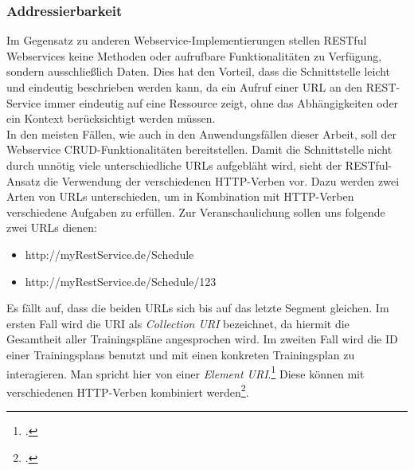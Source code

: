 \subsubsection*{Addressierbarkeit}
Im Gegensatz zu anderen Webservice-Implementierungen stellen RESTful Webservices keine Methoden oder aufrufbare Funktionalitäten zu Verfügung, sondern ausschließlich Daten. Dies hat den Vorteil, dass die Schnittstelle leicht und eindeutig beschrieben werden kann, da ein Aufruf einer URL an den REST-Service immer eindeutig auf eine Ressource zeigt, ohne das Abhängigkeiten oder ein Kontext berücksichtigt werden müssen. \\
In den meisten Fällen, wie auch in den Anwendungsfällen dieser Arbeit, soll der Webservice \ac{CRUD}-Funktionalitäten bereitstellen. Damit die Schnittstelle nicht durch unnötig viele unterschiedliche URLs aufgebläht wird, sieht der RESTful-Ansatz die Verwendung der verschiedenen HTTP-Verben vor. Dazu werden zwei Arten von URLs unterschieden, um in Kombination mit HTTP-Verben verschiedene Aufgaben zu erfüllen. Zur Veranschaulichung sollen uns folgende zwei URLs dienen:
\begin{itemize}
\item http://myRestService.de/Schedule
\item http://myRestService.de/Schedule/123
\end{itemize}
Es fällt auf, dass die beiden URLs sich bis auf das letzte Segment gleichen. Im ersten Fall wird die URI als \textit{Collection URI} bezeichnet, da hiermit die Gesamtheit aller Trainingspläne angesprochen wird. Im zweiten Fall wird die ID einer Trainingsplans benutzt und mit einen konkreten Trainingsplan zu interagieren. Man spricht hier von einer \textit{Element URI}.\footcite[S. 12ff.]{Building-a-REST-Service} Diese können mit verschiedenen HTTP-Verben kombiniert werden\footcite[S. 26ff.]{REST-und-HTTP}.

